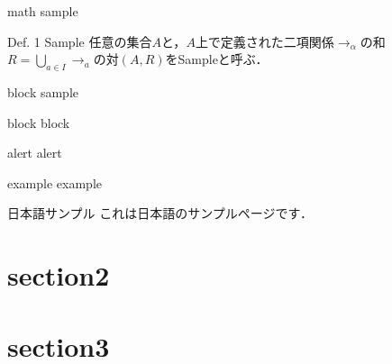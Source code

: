 \documentclass[aspectratio=1610,14pt]{beamer}
\begin{document}
\begin{frame}{math sample}
    \begin{block}{Def. 1 Sample}
        任意の集合$A$と，$A$上で定義された二項関係$\to_{\alpha}$の和$R = \bigcup_{a \in I} \to_a $の対$(A, R)$をSampleと呼ぶ．
    \end{block}

\end{frame}

\begin{frame}{block sample}
    \begin{block}{block}
        block
    \end{block}
    \begin{alertblock}{alert}
        alert
    \end{alertblock}
    \begin{exampleblock}{example}
        example
    \end{exampleblock}
\end{frame}

\begin{frame}{日本語サンプル}
    これは日本語のサンプルページです．
\end{frame}

\section{section2}

\begin{frame}
    \tableofcontents[currentsection]
\end{frame}
%
\section{section3}

\begin{frame}
    \tableofcontents[currentsection]
\end{frame}
%
%
%
%
\end{document}
